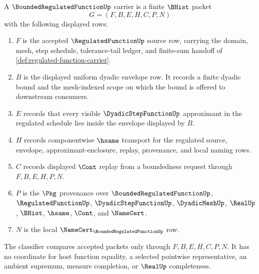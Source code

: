 \begin{definition}
\label{def:bounded-regulated-function-carrier}
A $\BoundedRegulatedFunctionUp$ carrier is a finite $\BHist$ packet
$$
G=(F,B,E,H,C,P,N)
$$
with the following displayed rows:
\begin{enumerate}
\item $F$ is the accepted $\RegulatedFunctionUp$ source row, carrying the domain, mesh, step schedule, tolerance-tail ledger, and finite-sum handoff of \autoref{def:regulated-function-carrier}.
\item $B$ is the displayed uniform dyadic envelope row. It records a finite dyadic bound and the mesh-indexed scope on which the bound is offered to downstream consumers.
\item $E$ records that every visible $\DyadicStepFunctionUp$ approximant in the regulated schedule lies inside the envelope displayed by $B$.
\item $H$ records componentwise $\hsame$ transport for the regulated source, envelope, approximant-enclosure, replay, provenance, and local naming rows.
\item $C$ records displayed $\Cont$ replay from a boundedness request through $F,B,E,H,P,N$.
\item $P$ is the $\Pkg$ provenance over $\BoundedRegulatedFunctionUp$, $\RegulatedFunctionUp$, $\DyadicStepFunctionUp$, $\DyadicMeshUp$, $\RealUp$, $\BHist$, $\hsame$, $\Cont$, and $\NameCert$.
\item $N$ is the local $\NameCert_{\BoundedRegulatedFunctionUp}$ row.
\end{enumerate}
The classifier compares accepted packets only through $F,B,E,H,C,P,N$. It has no coordinate for host function equality, a selected pointwise representative, an ambient supremum, measure completion, or $\RealUp$ completeness.
\end{definition}

